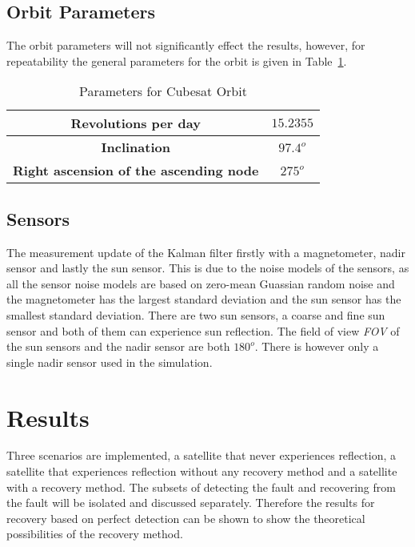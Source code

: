 \documentclass[letterpaper, 10 pt, conference]{ieeeconf}  %
\begin{document}

\subsection{Orbit Parameters}
The orbit parameters will not significantly effect the results, however, for repeatability the general parameters for the orbit is given in Table~\ref{Table:OrbitParameters}. 
	
\begin{table}[!htb]
	\caption{\label{Table:OrbitParameters}Parameters for Cubesat Orbit}
	\begin{tabular}{|c|c|}
		\hline
		\textbf{Revolutions per day}          & $15.2355$                    \\ \hline
		\textbf{Inclination}          & $97.4^o$                    \\ \hline
		\textbf{Right ascension of the ascending node} & $275^o$ \\ \hline
	\end{tabular}
\end{table}

\subsection{Sensors}
The measurement update of the Kalman filter firstly with a magnetometer, nadir sensor and lastly the sun sensor. This is due to the noise models of the sensors, as all the sensor noise models are based on zero-mean Guassian random noise and the magnetometer has the largest standard deviation and the sun sensor has the smallest standard deviation. There are two sun sensors, a coarse and fine sun sensor and both of them can experience sun reflection. The field of view \emph{FOV} of the sun sensors and the nadir sensor are both $180^o$. There is however only a single nadir sensor used in the simulation.

\section{Results}
\label{section:Results}
Three scenarios are implemented, a satellite that never experiences reflection, a satellite that experiences reflection without any recovery method and a satellite with a recovery method. The subsets of detecting the fault and recovering from the fault will be isolated and discussed separately. Therefore the results for recovery based on perfect detection can be shown to show the theoretical possibilities of the recovery method.
\end{document}
